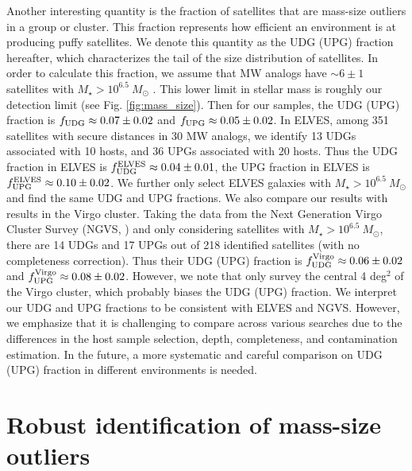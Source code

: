 \documentclass[twocolumn,astrosymb,twocolappendix,linenumbers]{aastex631}
\begin{document}
\begin{CJK*}{UTF8}{gbsn}
Another interesting quantity is the fraction of satellites that are mass-size outliers in a group or cluster. This fraction represents how efficient an environment is at producing puffy satellites. We denote this quantity as the UDG (UPG) fraction hereafter, which characterizes the tail of the size distribution of satellites. In order to calculate this fraction, we assume that MW analogs have $\sim 6 \pm 1$ satellites with $M_\star > 10^{6.5}\ M_\odot$ \citep{CarlstenELVES2022}. This lower limit in stellar mass is roughly our detection limit (see Fig. \ref{fig:mass_size}). Then for our samples, the UDG (UPG) fraction is $f_{\rm UDG} \approx 0.07 \pm 0.02$ and $f_{\rm UPG} \approx 0.05 \pm 0.02$. In ELVES, among 351 satellites with secure distances in 30 MW analogs, we identify 13 UDGs associated with 10 hosts, and 36 UPGs associated with 20 hosts. Thus the UDG fraction in ELVES is $f_{\rm UDG}^{\rm ELVES} \approx 0.04 \pm 0.01$, the UPG fraction in ELVES is $f_{\rm UPG}^{\rm ELVES} \approx 0.10 \pm 0.02$. We further only select ELVES galaxies with $M_\star > 10^{6.5}\ M_\odot$ and find the same UDG and UPG fractions. We also compare our results with results in the Virgo cluster. Taking the data from the Next Generation Virgo Cluster Survey (NGVS, \citealt{Ferrarese2020}) and only considering satellites with $M_\star > 10^{6.5}\ M_\odot$, there are 14 UDGs and 17 UPGs out of 218 identified satellites (with no completeness correction). Thus their UDG (UPG) fraction is $f_{\rm UDG}^{\rm Virgo} \approx 0.06\pm 0.02$ and $f_{\rm UPG}^{\rm Virgo} \approx 0.08\pm 0.02$. However, we note that \citet{Ferrarese2020} only survey the central 4 deg$^2$ of the Virgo cluster, which probably biases the UDG (UPG) fraction.
We interpret our UDG and UPG fractions to be consistent with ELVES and NGVS. However, we emphasize that it is challenging to compare across various searches due to the differences in the host sample selection, depth, completeness, and contamination estimation. In the future, a more systematic and careful comparison on UDG (UPG) fraction in different environments is needed. 


\section{Robust identification of mass-size outliers}\label{sec:discussion}



\end{CJK*}
\end{document}
